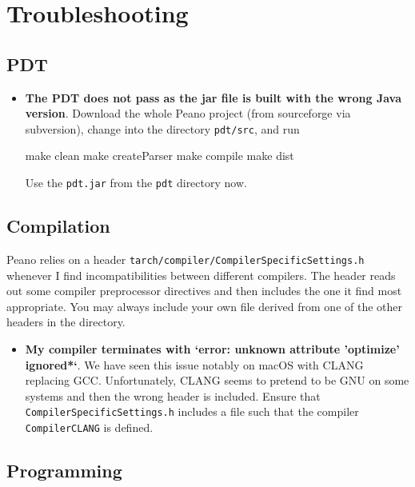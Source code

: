 \chapter{Troubleshooting}

\section{PDT}

\begin{itemize}
  \item \textbf{ The PDT does not pass as the jar file is built with the wrong
  Java version}. Download the whole Peano project (from sourceforge via subversion),
  change into the directory \texttt{pdt/src}, and run
  \begin{code}
  make clean
  make createParser
  make compile
  make dist
  \end{code}
  Use the \texttt{pdt.jar} from the \texttt{pdt} directory now. 
\end{itemize}





\section{Compilation}

Peano relies on a header \texttt{tarch/compiler/CompilerSpecificSettings.h}
whenever I find incompatibilities between different compilers. 
The header reads out some compiler preprocessor directives and then includes the
one it find most appropriate. 
You may always include your own file derived from one of the other headers in
the directory.


\begin{itemize}
  \item \textbf{ My compiler terminates with `error: unknown
   attribute 'optimize' ignored*`}. We have seen this issue notably on macOS
   with CLANG replacing GCC. Unfortunately, CLANG seems to pretend to be GNU on
   some systems and then the wrong header is included. Ensure that
   \texttt{CompilerSpecificSettings.h} includes a file such that the compiler
   \texttt{CompilerCLANG} is defined.
\end{itemize}




\section{Programming}

